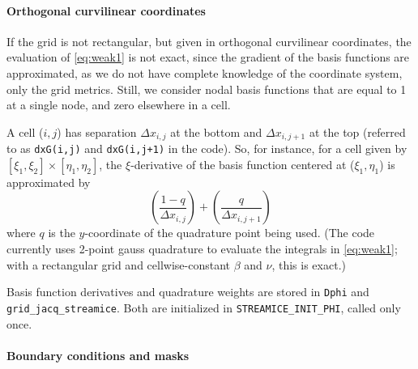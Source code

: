 \paragraph{Orthogonal curvilinear coordinates}

If the grid is not rectangular, but given in orthogonal curvilinear coordinates, the evaluation of \eqref{eq:weak1} is not exact, since the gradient of the basis functions are approximated, as we do not have complete knowledge of the coordinate system, only the grid metrics. Still, we consider nodal basis functions that are equal to 1 at a single node, and zero elsewhere in a cell. 

A cell ($i,j$) has separation $\Delta x_{i,j}$ at the bottom and $\Delta x_{i,j+1}$ at the top (referred to as \texttt{dxG(i,j)} and \texttt{dxG(i,j+1)} in the code). So, for instance, for a cell given by $[\xi_1,\xi_2]\times[\eta_1,\eta_2]$, the $\xi$-derivative of the basis function centered at ($\xi_1,\eta_1$) is approximated by
\begin{equation}
\left(\frac{1-q}{\Delta x_{i,j}}\right) + \left(\frac{q}{\Delta x_{i,j+1}}\right)
\end{equation}
where $q$ is the $y$-coordinate of the quadrature point being used. (The code currently uses 2-point gauss quadrature to evaluate the integrals in \eqref{eq:weak1}; with a rectangular grid and cellwise-constant $\beta$ and $\nu$, this is exact.)

Basis function derivatives and quadrature weights are stored in \texttt{Dphi} and \texttt{grid\_jacq\_streamice}. Both are initialized in \texttt{STREAMICE\_INIT\_PHI}, called only once.

\paragraph{Boundary conditions and masks}

